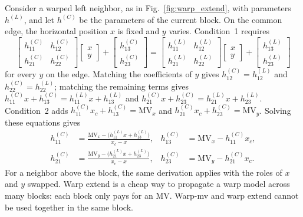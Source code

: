 \documentclass[journal]{IEEEtran}
\begin{document}
Consider a warped left neighbor, as in Fig.~\ref{fig:warp_extend}, with
parameters $h^{(L)}$, and let $h^{(C)}$ be the parameters of the current
block. On the common edge, the horizontal position $x$ is fixed and $y$
varies. Condition~1 requires
\begin{equation}
  \begin{bmatrix} h^{(C)}_{11} & h^{(C)}_{12} \\ h^{(C)}_{21} & h^{(C)}_{22}\end{bmatrix}
  \begin{bmatrix} x \\ y \end{bmatrix} +
  \begin{bmatrix} h^{(C)}_{13} \\ h^{(C)}_{23}\end{bmatrix} =
  \begin{bmatrix} h^{(L)}_{11} & h^{(L)}_{12} \\ h^{(L)}_{21} & h^{(L)}_{22}\end{bmatrix}
  \begin{bmatrix} x \\ y \end{bmatrix} +
  \begin{bmatrix} h^{(L)}_{13} \\ h^{(L)}_{23}\end{bmatrix}
\end{equation}
for every $y$ on the edge. Matching the coefficients of $y$ gives
$h^{(C)}_{12} = h^{(L)}_{12}$ and $h^{(C)}_{22} = h^{(L)}_{22}$; matching the
remaining terms gives
$h^{(C)}_{11}x + h^{(C)}_{13} = h^{(L)}_{11}x + h^{(L)}_{13}$ and
$h^{(C)}_{21}x + h^{(C)}_{23} = h^{(L)}_{21}x + h^{(L)}_{23}$.
Condition~2 adds $h^{(C)}_{11}x_c + h^{(C)}_{13} = \mathrm{MV}_x$ and
$h^{(C)}_{21}x_c + h^{(C)}_{23} = \mathrm{MV}_y$. Solving these equations gives
\begin{align}
  h^{(C)}_{11} &= \frac{\mathrm{MV}_x - \big(h^{(L)}_{11}x + h^{(L)}_{13}\big)}{x_c - x}, &
  h^{(C)}_{13} &= \mathrm{MV}_x - h^{(C)}_{11}x_c, \\
  h^{(C)}_{21} &= \frac{\mathrm{MV}_y - \big(h^{(L)}_{21}x + h^{(L)}_{23}\big)}{x_c - x}, &
  h^{(C)}_{23} &= \mathrm{MV}_y - h^{(C)}_{21}x_c .
\end{align}
For a neighbor above the block, the same derivation applies with the roles of
$x$ and $y$ swapped. Warp extend is a cheap way to propagate a warp model
across many blocks: each block only pays for an MV. Warp-mv and warp extend
cannot be used together in the same block.
\end{document}
